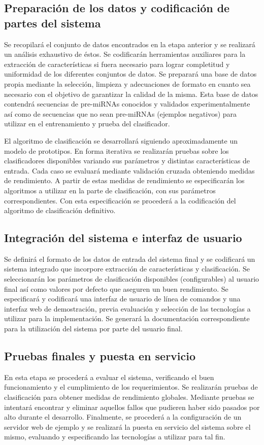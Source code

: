 \documentclass[12pt,bibliography=oldstyle,DIV=14,parskip=full-,titlepage]{scrartcl}
\begin{document}
\subsection{Preparación de los datos y codificación de partes del sistema}
Se recopilará el conjunto de datos encontrados en la etapa anterior y
se realizará un análisis exhaustivo de éstos.  Se codificarán
herramientas auxiliares para la extracción de características si fuera
necesario para lograr completitud y uniformidad de los diferentes
conjuntos de datos.  Se preparará una base de datos propia mediante la
selección, limpieza y adecuaciones de formato en cuanto sea necesario
con el objetivo de garantizar la calidad de la misma. Esta base de
datos contendrá secuencias de pre-miRNAs conocidos y validados
experimentalmente así como de secuencias que no sean pre-miRNAs
(ejemplos negativos) para utilizar en el entrenamiento y prueba del
clasificador.

El algoritmo de clasificación se desarrollará siguiendo
aproximadamente un modelo de prototipos. En forma iterativa se
realizarán pruebas sobre los clasificadores disponibles variando sus
parámetros y distintas características de entrada. Cada caso se
evaluará mediante validación cruzada obteniendo medidas de
rendimiento. A partir de estas medidas de rendimiento se especificarán
los algoritmos a utilizar en la parte de clasificación, con sus
parámetros correspondientes. Con esta especificación se procederá a la
codificación del algoritmo de clasificación definitivo.
%
\subsection{Integración del sistema e interfaz de usuario}
Se definirá el formato de los datos de entrada del sistema final y se
codificará un sistema integrado que incorpore extracción de
características y clasificación. Se seleccionarán los parámetros de
clasificación disponibles (configurables) al usuario final así como
valores por defecto que aseguren un buen rendimiento.
%
Se especificará y codificará una interfaz de usuario de línea de
comandos y una interfaz web de demostración, previa evaluación y
selección de las tecnologías a utilizar para la implementación.  Se
generará la documentación correspondiente para la utilización del
sistema por parte del usuario final.
%
\subsection{Pruebas finales y puesta en servicio}
En esta etapa se procederá a evaluar el sistema, verificando el buen
funcionamiento y el cumplimiento de los requerimientos. Se realizarán
pruebas de clasificación para obtener medidas de rendimiento
globales. Mediante pruebas se intentará encontrar y eliminar
aquellos fallos que pudieren haber sido pasados por alto durante el
desarrollo.
%
Finalmente, se procederá a la configuración de un servidor web de
ejemplo y se realizará la puesta en servicio del sistema sobre el
mismo, evaluando y especificando las tecnologías a utilizar para tal
fin.
%
%
\end{document}

